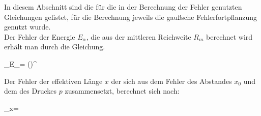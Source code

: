 In diesem Abschnitt sind die für die in der Berechnung der Fehler
genutzten Gleichungen gelistet, für die Berechnung jeweils die 
gaußsche Fehlerfortpflanzung genutzt wurde.\\

Der Fehler der Energie $E_{\alpha}$, die aus der mittleren Reichweite $R_{m}$ 
berechnet wird erhält man durch die Gleichung.
\begin{errorEquation}
	\sigma_{E_{\alpha}}=  \big(\big)^{}
	\label{std:Energie}
\end{errorEquation}

Der Fehler der effektiven Länge $x$ der sich aus dem Fehler des Abstandes 
$x_{0}$ und dem des Druckes $p$ zusammensetzt, berechnet sich nach:

\begin{errorEquation}
	\sigma_{x}= 
	\label{std:effektiveLaenge}
\end{errorEquation}

